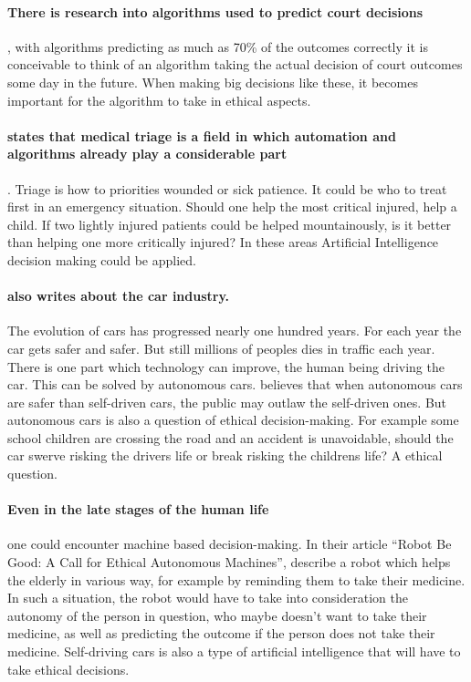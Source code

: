 \documentclass[11pt]{article}
\begin{document}
\paragraph{There is research into algorithms used to predict court decisions}
\cite{martin2004competing}, with algorithms predicting as much
as 70\% of the outcomes correctly \cite{Kravets2014Court} it is
conceivable to think of an algorithm taking the actual decision of court
outcomes some day in the future. When making big decisions like these, it
becomes important for the algorithm to take in ethical aspects.

\paragraph{ states that medical triage is a field in which automation and algorithms already play a considerable part}. Triage is how to priorities wounded or sick patience. It could be who to treat first in an emergency situation. Should one help the most critical injured, help a child. If two lightly injured patients could be helped mountainously, is it better than helping one more critically injured? In these areas Artificial Intelligence decision making could be applied.

\paragraph{\citeauthor{Chatfield2014automate} also writes about the car industry.} The evolution of cars has progressed nearly one hundred years. For each year the car gets safer and safer. But still millions of peoples dies in traffic each year. There is one part which technology can improve, the human being driving the car. This can be solved by autonomous cars. \citeauthor{elonmuskTweet} believes that when autonomous cars are safer than self-driven cars, the public may outlaw the self-driven ones. But autonomous cars is also a question of ethical decision-making. For example some school children are crossing the road and an accident is unavoidable, should the car swerve risking the drivers life or break risking the childrens life? A ethical question.

\paragraph{Even in the late stages of the human life} one could encounter machine based decision-making. In their article “Robot Be Good: A Call for Ethical Autonomous
Machines”, \citeauthor{anderson2010robot} describe a robot which
helps the elderly in various way, for example by reminding them to take their
medicine. In such a situation, the robot would have to take into consideration
the autonomy of the person in question, who maybe doesn't want to take their
medicine, as well as predicting the outcome if the person does not take their
medicine. Self-driving cars is also a type of artificial intelligence that will
have to take ethical decisions.
\end{document}
